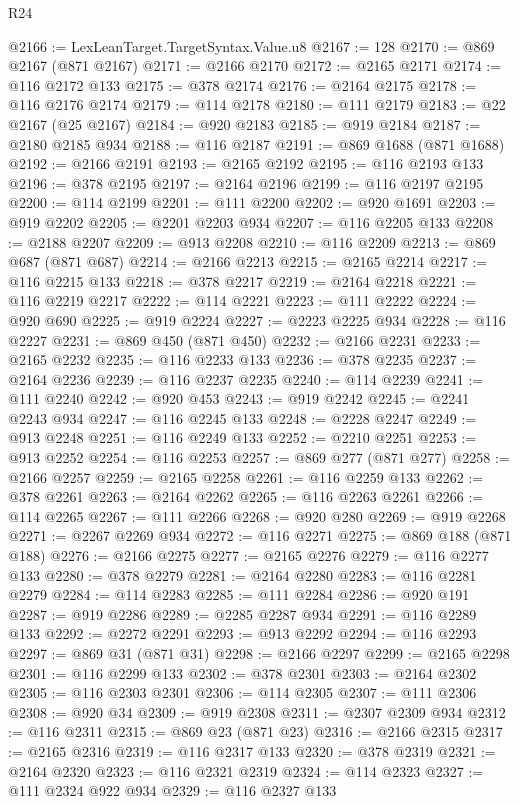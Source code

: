 \begin{lexlean}{R24}
\begin{coremodule}
@2166 := LexLeanTarget.TargetSyntax.Value.u8
@2167 := 128
@2170 := @869 @2167 (@871 @2167)
@2171 := @2166 @2170
@2172 := @2165 @2171
@2174 := @116 @2172 @133
@2175 := @378 @2174
@2176 := @2164 @2175
@2178 := @116 @2176 @2174
@2179 := @114 @2178
@2180 := @111 @2179
@2183 := @22 @2167 (@25 @2167)
@2184 := @920 @2183
@2185 := @919 @2184
@2187 := @2180 @2185 @934
@2188 := @116 @2187
@2191 := @869 @1688 (@871 @1688)
@2192 := @2166 @2191
@2193 := @2165 @2192
@2195 := @116 @2193 @133
@2196 := @378 @2195
@2197 := @2164 @2196
@2199 := @116 @2197 @2195
@2200 := @114 @2199
@2201 := @111 @2200
@2202 := @920 @1691
@2203 := @919 @2202
@2205 := @2201 @2203 @934
@2207 := @116 @2205 @133
@2208 := @2188 @2207
@2209 := @913 @2208
@2210 := @116 @2209
@2213 := @869 @687 (@871 @687)
@2214 := @2166 @2213
@2215 := @2165 @2214
@2217 := @116 @2215 @133
@2218 := @378 @2217
@2219 := @2164 @2218
@2221 := @116 @2219 @2217
@2222 := @114 @2221
@2223 := @111 @2222
@2224 := @920 @690
@2225 := @919 @2224
@2227 := @2223 @2225 @934
@2228 := @116 @2227
@2231 := @869 @450 (@871 @450)
@2232 := @2166 @2231
@2233 := @2165 @2232
@2235 := @116 @2233 @133
@2236 := @378 @2235
@2237 := @2164 @2236
@2239 := @116 @2237 @2235
@2240 := @114 @2239
@2241 := @111 @2240
@2242 := @920 @453
@2243 := @919 @2242
@2245 := @2241 @2243 @934
@2247 := @116 @2245 @133
@2248 := @2228 @2247
@2249 := @913 @2248
@2251 := @116 @2249 @133
@2252 := @2210 @2251
@2253 := @913 @2252
@2254 := @116 @2253
@2257 := @869 @277 (@871 @277)
@2258 := @2166 @2257
@2259 := @2165 @2258
@2261 := @116 @2259 @133
@2262 := @378 @2261
@2263 := @2164 @2262
@2265 := @116 @2263 @2261
@2266 := @114 @2265
@2267 := @111 @2266
@2268 := @920 @280
@2269 := @919 @2268
@2271 := @2267 @2269 @934
@2272 := @116 @2271
@2275 := @869 @188 (@871 @188)
@2276 := @2166 @2275
@2277 := @2165 @2276
@2279 := @116 @2277 @133
@2280 := @378 @2279
@2281 := @2164 @2280
@2283 := @116 @2281 @2279
@2284 := @114 @2283
@2285 := @111 @2284
@2286 := @920 @191
@2287 := @919 @2286
@2289 := @2285 @2287 @934
@2291 := @116 @2289 @133
@2292 := @2272 @2291
@2293 := @913 @2292
@2294 := @116 @2293
@2297 := @869 @31 (@871 @31)
@2298 := @2166 @2297
@2299 := @2165 @2298
@2301 := @116 @2299 @133
@2302 := @378 @2301
@2303 := @2164 @2302
@2305 := @116 @2303 @2301
@2306 := @114 @2305
@2307 := @111 @2306
@2308 := @920 @34
@2309 := @919 @2308
@2311 := @2307 @2309 @934
@2312 := @116 @2311
@2315 := @869 @23 (@871 @23)
@2316 := @2166 @2315
@2317 := @2165 @2316
@2319 := @116 @2317 @133
@2320 := @378 @2319
@2321 := @2164 @2320
@2323 := @116 @2321 @2319
@2324 := @114 @2323
@2327 := @111 @2324 @922 @934
@2329 := @116 @2327 @133

\end{coremodule}
\end{lexlean}
